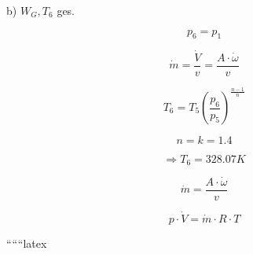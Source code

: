 b) \( W_G, T_6 \) ges.

\[
p_6 = p_1
\]

\[
\dot{m} = \frac{\dot{V}}{v} = \frac{A \cdot \dot{\omega}}{v}
\]

\[
T_6 = T_5 \left( \frac{p_6}{p_5} \right)^{\frac{n-1}{n}}
\]

\[
n = k = 1.4
\]

\[
\Rightarrow T_6 = 328.07 K
\]

\[
\dot{m} = \frac{A \cdot \dot{\omega}}{v}
\]

\[
p \cdot \dot{V} = \dot{m} \cdot R \cdot T
\]

``````latex
